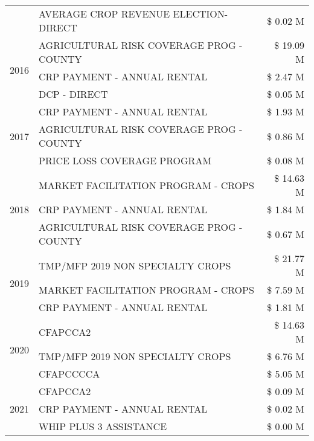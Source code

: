 \begin{tabular}{llr}
 & AVERAGE CROP REVENUE ELECTION-DIRECT & \$ 0.02 M \\
\cline{1-3}
\multirow[t]{3}{*}{2016} & AGRICULTURAL RISK COVERAGE PROG - COUNTY      & \$ 19.09 M \\
 & CRP PAYMENT - ANNUAL RENTAL                   & \$ 2.47 M \\
 & DCP - DIRECT                                  & \$ 0.05 M \\
\cline{1-3}
\multirow[t]{3}{*}{2017} & CRP PAYMENT - ANNUAL RENTAL & \$ 1.93 M \\
 & AGRICULTURAL RISK COVERAGE PROG - COUNTY & \$ 0.86 M \\
 & PRICE LOSS COVERAGE PROGRAM & \$ 0.08 M \\
\cline{1-3}
\multirow[t]{3}{*}{2018} & MARKET FACILITATION PROGRAM - CROPS & \$ 14.63 M \\
 & CRP PAYMENT - ANNUAL RENTAL & \$ 1.84 M \\
 & AGRICULTURAL RISK COVERAGE PROG - COUNTY & \$ 0.67 M \\
\cline{1-3}
\multirow[t]{3}{*}{2019} & TMP/MFP 2019 NON SPECIALTY CROPS & \$ 21.77 M \\
 & MARKET FACILITATION PROGRAM - CROPS & \$ 7.59 M \\
 & CRP PAYMENT - ANNUAL RENTAL & \$ 1.81 M \\
\cline{1-3}
\multirow[t]{3}{*}{2020} & CFAPCCA2 & \$ 14.63 M \\
 & TMP/MFP 2019 NON SPECIALTY CROPS & \$ 6.76 M \\
 & CFAPCCCCA & \$ 5.05 M \\
\cline{1-3}
\multirow[t]{3}{*}{2021} & CFAPCCA2 & \$ 0.09 M \\
 & CRP PAYMENT - ANNUAL RENTAL & \$ 0.02 M \\
 & WHIP PLUS 3 ASSISTANCE & \$ 0.00 M \\
\cline{1-3}
\bottomrule
\end{tabular}
